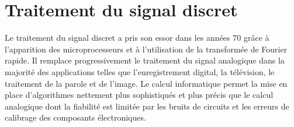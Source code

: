 \chapter{Traitement du signal discret}
\label{discret-chap}
Le traitement du signal discret a pris son essor dans les ann\'ees
70 gr\^ace \`a
l'apparition des microprocesseurs et \`a l'utilisation de
la transform\'ee de Fourier rapide.
Il remplace progressivement le
traitement du signal analogique dans la majorit\'e des applications
telles que l'enregistrement digital, la t\'el\'evision, le
traitement de la parole et de l'image.
Le calcul informatique permet la mise en
place d'algorithmes
nettement plus sophistiqu\'es et plus pr\'ecis que le
calcul analogique
dont la fiabilit\'e est limit\'ee par
les bruits de circuits et les erreurs
de calibrage des composants \'electroniques.
%
%
%
%
%
